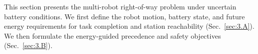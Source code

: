 This section presents the multi-robot right-of-way problem under uncertain battery conditions. 
We first define the robot motion, battery state, and future energy requirements for task completion and station reachability (Sec.~\ref{sec:3.A}). 
We then formulate the energy-guided precedence and safety objectives (Sec.~\ref{sec:3.B}).